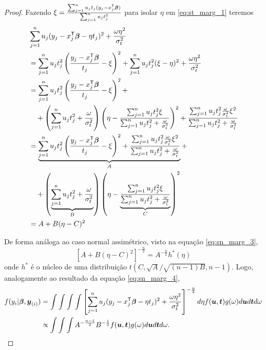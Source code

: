 \begin{proof}
Fazendo $\xi = \frac{\sum_{j=1}^nu_jt_j(y_j-x_j^{\mathsf{T}}{\boldsymbol{\beta}})}{\sum_{j=1}^nu_jt_j^2}$ para isolar $\eta$ em \eqref{eq:st_marg_1} teremos
\begin{equation}\label{eq:st_marg_2}
\begin{split}
&\sum_{j=1}^nu_j(y_j-x_j^{\mathsf{T}}{\boldsymbol{\beta}} - \eta t_j)^2+\frac{\omega\eta^2}{\sigma^2_t} \\
& =  \sum_{j=1}^nu_jt_j^2\left(\frac{y_j-x_j^{\mathsf{T}}{\boldsymbol{\beta}}}{t_j} - \xi\right)^2+\sum_{j=1}^nu_jt_j^2(\xi-\eta)^2+\frac{\omega\eta^2}{\sigma^2_t} \\
{} & =  \sum_{j=1}^nu_jt_j^2\left(\frac{y_j-x_j^{\mathsf{T}}{\boldsymbol{\beta}}}{t_j} - \xi\right)^2+ \\
{} & \quad + \left(\sum_{j=1}^nu_jt_j^2+\frac{\omega}{\sigma^2_t}\right)\left(\eta-\frac{\sum_{j=1}^nu_jt_j^2\xi}{\sum_{j=1}^nu_jt_j^2+\frac{\omega}{\sigma^2_t}}\right)^2+\frac{\sum_{j=1}^nu_jt_j^2\frac{\omega}{\sigma^2_t}\xi^2}{\sum_{j=1}^nu_jt_j^2+\frac{\omega}{\sigma^2_t}} \\
{} & =  \underbrace{\sum_{j=1}^nu_jt_j^2\left(\frac{y_j-x_j^{\mathsf{T}}{\boldsymbol{\beta}}}{t_j} - \xi\right)^2 + \frac{\sum_{j=1}^nu_jt_j^2\frac{\omega}{\sigma^2_t}\xi^2}{\sum_{j=1}^nu_jt_j^2+\frac{\omega}{\sigma^2_t}}}_{A} + \\
{} & \quad + \left(\underbrace{\sum_{j=1}^nu_jt_j^2+\frac{\omega}{\sigma^2_t}}_{B}\right)\left(\eta-\underbrace{\frac{\sum_{j=1}^nu_jt_j^2\xi}{\sum_{j=1}^nu_jt_j^2+\frac{\omega}{\sigma^2_t}}}_{C}\right)^2 \\
{} & = A + B(\eta - C)^2
\end{split}
\end{equation}

De forma análoga ao caso normal assimétrico, visto na equação \eqref{eq:sn_marg_3},
\begin{equation}\label{eq:st_marg_3}
\left[A + B(\eta - C)^2\right]^{-\frac{n}{2}} = A^{-\frac{n}{2}}h^*(\eta)
\end{equation}
onde $h^*$ é o núcleo de uma distribuição $t(C,\sqrt{A}/\sqrt{(n-1)B},n-1)$. Logo, analogamente ao resultado da equação \eqref{eq:sn_marg_4},
\begin{equation}\label{eq:st_marg_4}
\begin{split}
f(y_i|{\boldsymbol{\beta}},{\boldsymbol{y}_{(i)}})  &=  \int \int\int\int\left[\sum_{j=1}^nu_j(y_j-x_j^{\mathsf{T}}{\boldsymbol{\beta}} - \eta t_j)^2+\frac{\omega\eta^2}{\sigma^2_t}\right]^{-\frac{n}{2}} d\eta f({\boldsymbol{u}},{\boldsymbol{t}})g(\omega)d{\boldsymbol{u}} d{\boldsymbol{t}} d\omega \\
{} & \propto \int\int\int A^{-\frac{n-1}{2}} B^{-\frac{1}{2}} f({\boldsymbol{u}},{\boldsymbol{t}})g(\omega)d{\boldsymbol{u}} d{\boldsymbol{t}} d\omega.\\
\end{split}
\end{equation}


\end{proof}
